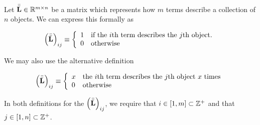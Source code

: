 \documentclass[../ClusteringConnectionsMAIN.tex]{subfiles}
\begin{document}
\begin{flushleft}
\begin{large}

Let $\bar{\bar{\mathbf{L}}} \in \mathbb{R}^{m \times n}$ be a matrix which represents how $m$ terms describe a collection of $n$ objects.  We can express this formally as

\begin{align}
\left( \bar{\bar{\mathbf{L}}} \right)_{ij} \equiv \left\{
\begin{array}{l l}
1 & \text{if the $i$th term describes the $j$th object.} \\
0 & \text{otherwise}
\end{array}
\right.
\end{align}

We may also use the alternative definition

\begin{align}
\left( \bar{\bar{\mathbf{L}}} \right)_{ij} \equiv \left\{
\begin{array}{l l}
x & \text{the $i$th term describes the $j$th object $x$ times} \\
0 & \text{otherwise}
\end{array}
\right.
\end{align}

In both definitions for the $\left( \bar{\bar{\mathbf{L}}} \right)_{ij}$, we require that $i \in \left[ 1, m \right] \subset \mathbb{Z}^+$ and that $j \in \left[ 1, n \right] \subset \mathbb{Z}^+$.

\end{large}
\end{flushleft}
\end{document}
